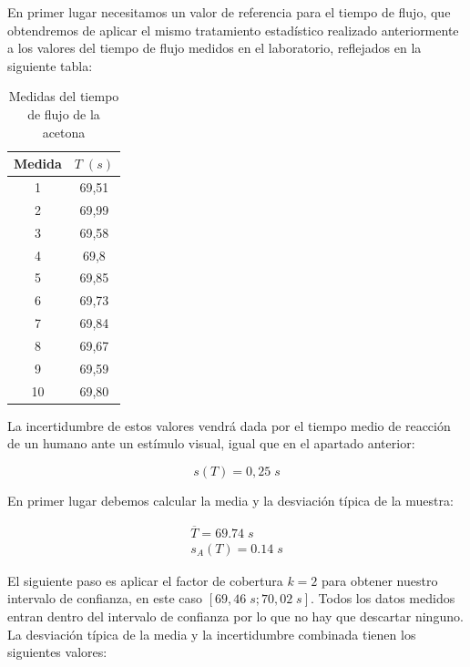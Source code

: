 \documentclass[a4paper,12pt,titlepage]{report}
\begin{document}
\par En primer lugar necesitamos un valor de referencia para el tiempo de flujo, que obtendremos de aplicar el mismo tratamiento estadístico realizado anteriormente a los valores del tiempo de flujo medidos en el laboratorio, reflejados en la siguiente tabla:

\begin{table}[h!]
    \centering
    \begin{tabular}{|c|c|}
    \hline
    Medida   & $T \; (s)$ \\ \hline
    1  & 69,51 \\ \hline
    2  & 69,99 \\ \hline
    3  & 69,58 \\ \hline
    4  & 69,8  \\ \hline
    5  & 69,85 \\ \hline
    6  & 69,73 \\ \hline
    7  & 69,84 \\ \hline
    8  & 69,67 \\ \hline
    9  & 69,59 \\ \hline
    10 & 69,80  \\ \hline
    \end{tabular}
    \caption{Medidas del tiempo de flujo de la acetona}
    \label{T acetona}
\end{table}

\newpage

La incertidumbre de estos valores vendrá dada por el tiempo medio de reacción de un humano ante un estímulo visual, igual que en el apartado anterior:

\begin{equation}
    s(T) = 0,25 \; s
\end{equation}

En primer lugar debemos calcular la media y la desviación típica de la muestra:

\begin{equation}
    \begin{gathered}
        \overline{T} = 69.74 \;s\\
        s_A(T) = 0.14 \;s
    \end{gathered}
\end{equation}

El siguiente paso es aplicar el factor de cobertura $k=2$ para obtener nuestro intervalo de confianza, en este caso $[69,46\; s;70,02\; s]$. Todos los datos medidos entran dentro del intervalo de confianza por lo que no hay que descartar ninguno. La desviación típica de la media y la incertidumbre combinada tienen los siguientes valores:
\end{document}
